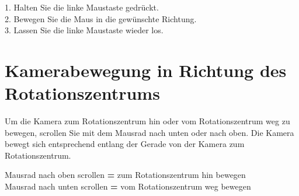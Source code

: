 1. Halten Sie die linke Maustaste gedrückt.\\
2. Bewegen Sie die Maus in die gewünschte Richtung.\\
3. Lassen Sie die linke Maustaste wieder los.\\

\section{Kamerabewegung in Richtung des Rotationszentrums}
Um die Kamera zum Rotationszentrum hin oder vom Rotationszentrum weg zu bewegen, scrollen Sie mit dem Mausrad nach unten oder nach oben. Die Kamera bewegt sich entsprechend entlang der Gerade von
der Kamera zum Rotationszentrum.

Mausrad nach oben scrollen \textbf{=} zum Rotationszentrum hin bewegen\\
Mausrad nach unten scrollen \textbf{=} vom Rotationszentrum weg bewegen
